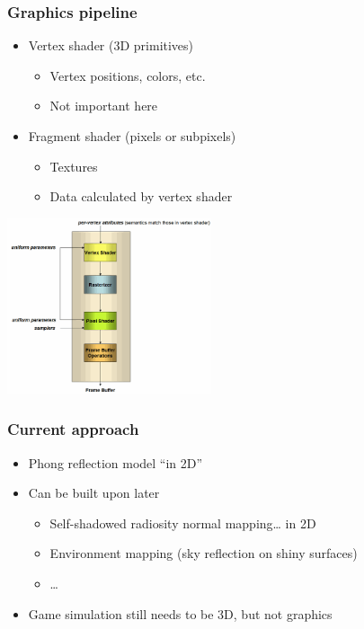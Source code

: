 \documentclass{beamer}
\begin{document}
\begin{frame}\frametitle{Graphics pipeline}

\begin{itemize}
\item
  Vertex shader (3D primitives)

  \begin{itemize}
  \item
    Vertex positions, colors, etc.
  \item
    Not important here
  \end{itemize}
\item
  Fragment shader (pixels or subpixels)

  \begin{itemize}
  \item
    Textures
  \item
    Data calculated by vertex shader
  \end{itemize}
\end{itemize}
\begin{center}
\includegraphics[width=0.45\textwidth]{pipeline.png}
\end{center}

\end{frame}

\begin{frame}\frametitle{Current approach}

\begin{itemize}
\item
  Phong reflection model ``in 2D''
\item
  Can be built upon later

  \begin{itemize}
  \item
    Self-shadowed radiosity normal mapping\ldots{} in 2D
  \item
    Environment mapping (sky reflection on shiny surfaces)
  \item
    \ldots{}
  \end{itemize}
\item
  Game simulation still needs to be 3D, but not graphics
\end{itemize}

\end{frame}
\end{document}
